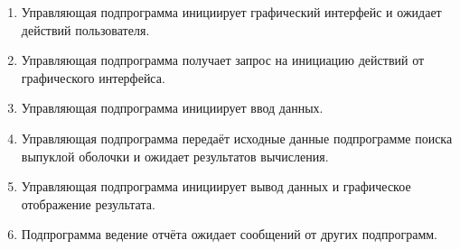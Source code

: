 \documentclass[a4paper,12pt,notitlepage,headsepline,pdftex]{scrartcl}
\begin{document}
\begin{enumerate}
  \item Управляющая подпрограмма инициирует графический интерфейс и ожидает
    действий пользователя.
  \item Управляющая подпрограмма получает запрос на инициацию действий от
    графического интерфейса.
  \item Управляющая подпрограмма инициирует ввод данных.
  \item Управляющая подпрограмма передаёт исходные данные подпрограмме поиска
    выпуклой оболочки и ожидает результатов вычисления.
  \item Управляющая подпрограмма инициирует вывод данных и графическое
    отображение результата.
  \item Подпрограмма ведение отчёта ожидает сообщений от других подпрограмм.
\end{enumerate}
\end{document}
